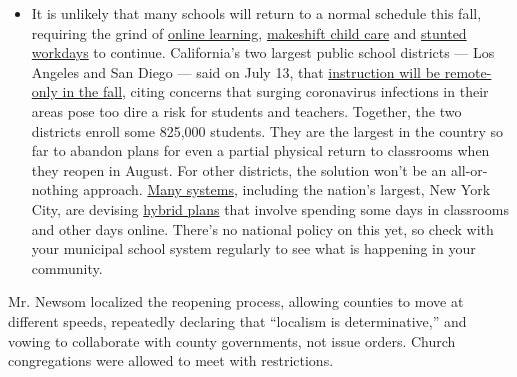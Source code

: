 \begin{itemize}
  \begin{itemize}
  \tightlist
  \item
    It is unlikely that many schools will return to a normal schedule
    this fall, requiring the grind of
    \href{https://www.nytimes.com/2020/06/05/us/coronavirus-education-lost-learning.html?action=click\&pgtype=Article\&state=default\&region=MAIN_CONTENT_3\&context=storylines_faq}{online
    learning},
    \href{https://www.nytimes.com/2020/05/29/us/coronavirus-child-care-centers.html?action=click\&pgtype=Article\&state=default\&region=MAIN_CONTENT_3\&context=storylines_faq}{makeshift
    child care} and
    \href{https://www.nytimes.com/2020/06/03/business/economy/coronavirus-working-women.html?action=click\&pgtype=Article\&state=default\&region=MAIN_CONTENT_3\&context=storylines_faq}{stunted
    workdays} to continue. California's two largest public school
    districts --- Los Angeles and San Diego --- said on July 13, that
    \href{https://www.nytimes.com/2020/07/13/us/lausd-san-diego-school-reopening.html?action=click\&pgtype=Article\&state=default\&region=MAIN_CONTENT_3\&context=storylines_faq}{instruction
    will be remote-only in the fall}, citing concerns that surging
    coronavirus infections in their areas pose too dire a risk for
    students and teachers. Together, the two districts enroll some
    825,000 students. They are the largest in the country so far to
    abandon plans for even a partial physical return to classrooms when
    they reopen in August. For other districts, the solution won't be an
    all-or-nothing approach.
    \href{https://bioethics.jhu.edu/research-and-outreach/projects/eschool-initiative/school-policy-tracker/}{Many
    systems}, including the nation's largest, New York City, are
    devising
    \href{https://www.nytimes.com/2020/06/26/us/coronavirus-schools-reopen-fall.html?action=click\&pgtype=Article\&state=default\&region=MAIN_CONTENT_3\&context=storylines_faq}{hybrid
    plans} that involve spending some days in classrooms and other days
    online. There's no national policy on this yet, so check with your
    municipal school system regularly to see what is happening in your
    community.
  \end{itemize}
\end{itemize}

Mr. Newsom localized the reopening process, allowing counties to move at
different speeds, repeatedly declaring that ``localism is
determinative,'' and vowing to collaborate with county governments, not
issue orders. Church congregations were allowed to meet with
restrictions.


